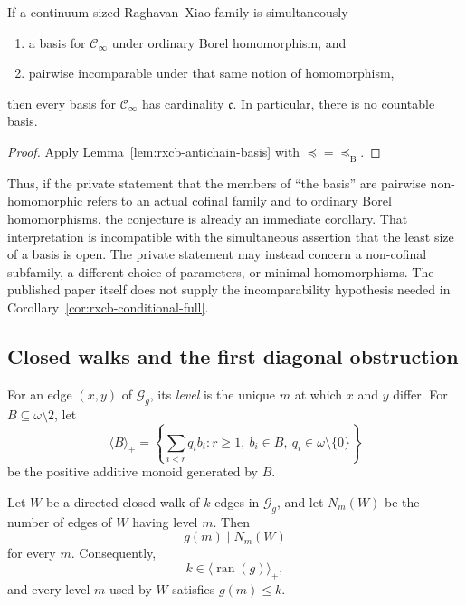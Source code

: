 \begin{corollary}
\label{cor:rxcb-conditional-full}
If a continuum-sized Raghavan--Xiao family is simultaneously
\begin{enumerate}
  \item a basis for $\mathcal C_\infty$ under ordinary Borel
  homomorphism, and
  \item pairwise incomparable under that same notion of homomorphism,
\end{enumerate}
then every basis for $\mathcal C_\infty$ has cardinality
$\mathfrak c$.  In particular, there is no countable basis.
\end{corollary}

\begin{proof}
Apply Lemma~\ref{lem:rxcb-antichain-basis} with
$\preceq=\preceq_{\mathrm B}$.
\end{proof}

Thus, if the private statement that the members of ``the basis'' are
pairwise non-homomorphic refers to an actual cofinal family and to
ordinary Borel homomorphisms, the conjecture is already an immediate
corollary.  That interpretation is incompatible with the simultaneous
assertion that the least size of a basis is open.  The private
statement may instead concern a non-cofinal subfamily, a different
choice of parameters, or minimal homomorphisms.  The published paper
itself does not supply the incomparability hypothesis needed in
Corollary~\ref{cor:rxcb-conditional-full}.

\subsection{Closed walks and the first diagonal obstruction}
\label{subsec:rxcb-walks}

For an edge $(x,y)$ of $\mathcal G_g$, its \emph{level} is the unique
$m$ at which $x$ and $y$ differ.  For
$B\subseteq\omega\setminus2$, let
\[
  \langle B\rangle_+
  =\left\{\sum_{i<r}q_i b_i:
    r\geq1,\ b_i\in B,\ q_i\in\omega\setminus\{0\}\right\}
\]
be the positive additive monoid generated by $B$.

\begin{lemma}
\label{lem:rxcb-level-counting}
Let $W$ be a directed closed walk of $k$ edges in $\mathcal G_g$, and
let $N_m(W)$ be the number of edges of $W$ having level $m$.  Then
\[
  g(m)\mid N_m(W)
\]
for every $m$.  Consequently,
\[
  k\in\langle\operatorname{ran}(g)\rangle_+,
\]
and every level $m$ used by $W$ satisfies $g(m)\leq k$.
\end{lemma}

